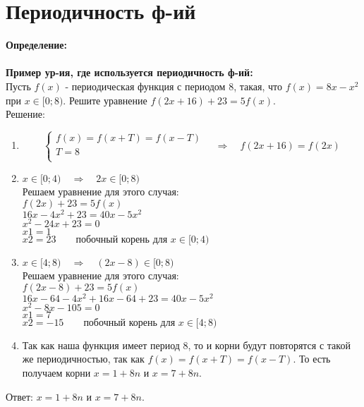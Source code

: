 \section{Периодичность ф-ий}
\textbf{Определение:}\\
\textbf{}\\

\textbf{Пример ур-ия, где используется периодичность ф-ий:}\\
Пусть $f(x)$ - периодическая функция с периодом 8, такая, что $f(x) = 8x - x^{2}$ при $x \in [0; 8)$. Решите уравнение $f(2x + 16) + 23 = 5f(x)$.\\
Решение:\\
\begin{enumerate}
	\item$$\begin{cases}
				f(x) = f(x + T) = f(x - T)\\
				T = 8\\
			\end{cases}
		 \quad \Longrightarrow \quad f(2x + 16) = f(2x)$$
	\item $x \in [0; 4) \quad \Longrightarrow \quad 2x \in [0; 8)$\\
		Решаем уравнение для этого случая:\\
		$f(2x) + 23 = 5f(x)$\\
		$16x - 4x^{2} + 23 = 40x - 5x^{2}$\\
		$x^{2} - 24x + 23 = 0$\\
		$x1 = 1$\\
		$x2 = 23\qquad \mbox{побочный корень для }x \in [0; 4)$\\
	\item $x \in [4; 8) \quad \Longrightarrow \quad (2x - 8) \in [0; 8)$\\
	Решаем уравнение для этого случая:\\
	$f(2x - 8) + 23 = 5f(x)$\\
	$16x - 64 - 4x^{2} + 16x - 64  + 23 = 40x - 5x^{2}$\\
	$x^{2} - 8x - 105 = 0$\\
	$x1 = 7$\\
	$x2 = -15\qquad \mbox{побочный корень для }x \in [4; 8)$\\
			
	\item Так как наша функция имеет период 8, то и корни будут повторятся с такой же периодичностью, так как $f(x) = f(x + T) = f(x - T)$.
	 То есть получаем корни $x = 1 + 8n$ и $x = 7 + 8n$.
\end{enumerate}
Ответ: $x = 1 + 8n$ и $x = 7 + 8n$.